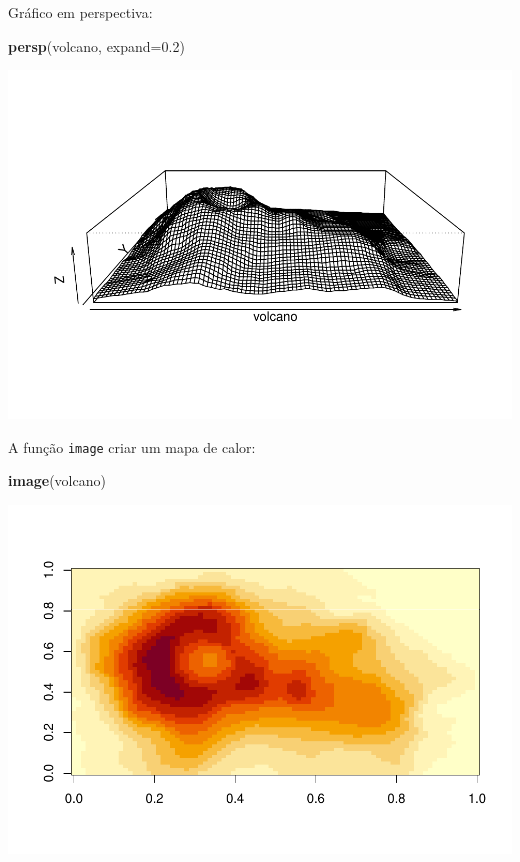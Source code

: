 \documentclass[
]{book}
\newenvironment{Shaded}{\begin{snugshade}}{\end{snugshade}}
\newcommand{\DataTypeTok}[1]{\textcolor[rgb]{0.13,0.29,0.53}{#1}}
\newcommand{\FloatTok}[1]{\textcolor[rgb]{0.00,0.00,0.81}{#1}}
\newcommand{\KeywordTok}[1]{\textcolor[rgb]{0.13,0.29,0.53}{\textbf{#1}}}
\newcommand{\NormalTok}[1]{#1}
\begin{document}
Gráfico em perspectiva:

\begin{Shaded}
\begin{Highlighting}[]
\KeywordTok{persp}\NormalTok{(volcano, }\DataTypeTok{expand=}\FloatTok{0.2}\NormalTok{)}
\end{Highlighting}
\end{Shaded}

\includegraphics{TudodoR_files/figure-latex/unnamed-chunk-75-1.pdf}

A função \texttt{image} criar um mapa de calor:

\begin{Shaded}
\begin{Highlighting}[]
\KeywordTok{image}\NormalTok{(volcano)}
\end{Highlighting}
\end{Shaded}

\includegraphics{TudodoR_files/figure-latex/unnamed-chunk-76-1.pdf}
\end{document}
